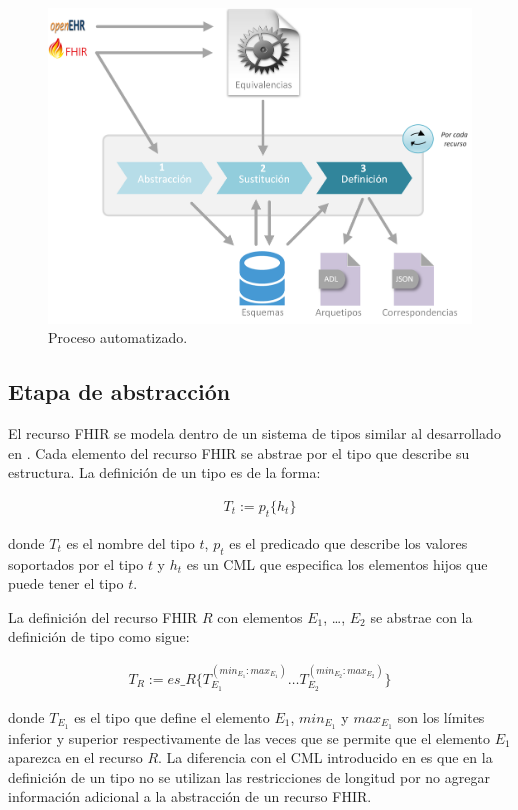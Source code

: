 \begin{figure}[h]
  \centering
  \includegraphics[scale=0.5]{./images/solution.png}
  \caption{Proceso automatizado.}
  \label{fig:solution}
\end{figure}

\subsection{Etapa de abstracción}

El recurso FHIR se modela dentro de un sistema de tipos similar al desarrollado en \cite{Maldonado09}. Cada elemento del recurso FHIR se abstrae por el tipo que describe su estructura. La definición de un tipo es de la forma:

\begin{align*}
T_t:=p_t\{h_t\}
\end{align*}

\noindent
donde \(T_t\) es el nombre del tipo \(t\), \(p_t\) es el predicado que describe los valores soportados por el tipo \(t\) y \(h_t\) es un CML que especifica los elementos hijos que puede tener el tipo \(t\).

La definición del recurso FHIR \(R\) con elementos \(E_1\), \dots , \(E_2\) se abstrae con la definición de tipo como sigue:

\begin{align*}
T_R:=es\_R\{T_{E_1}^{(min_{E_1} \colon max_{E_1})} \dots T_{E_2}^{(min_{E_2} \colon max_{E_2})}\}
\end{align*}

\noindent
donde \(T_{E_1}\) es el tipo que define el elemento \(E_1\), \(min_{E_1}\) y \(max_{E_1}\) son los límites inferior y superior respectivamente de las veces que se permite que el elemento \(E_1\) aparezca en el recurso \(R\). La diferencia con el CML introducido en \cite{Maldonado09} es que en la definición de un tipo no se utilizan las restricciones de longitud por no agregar información adicional a la abstracción de un recurso FHIR.

